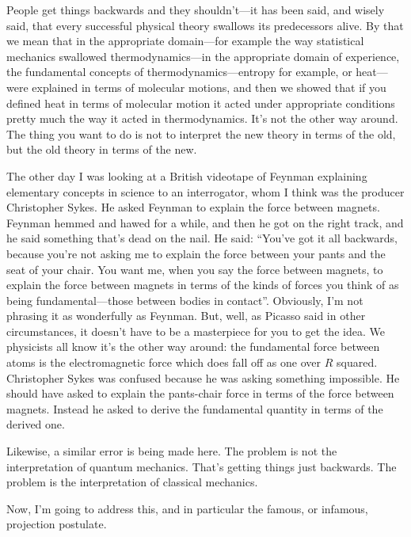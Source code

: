 \documentclass[12pt,nofootinbib]{revtex4}
\begin{document}
People get things backwards and they shouldn't---it has been said, and wisely said, that every successful physical theory swallows its predecessors alive. By that we mean that in the appropriate domain---for example the way statistical mechanics swallowed thermodynamics---in the appropriate domain of experience, the fundamental concepts of thermodynamics---entropy for example, or heat---were explained in terms of molecular motions, and then we showed that if you defined heat in terms of molecular motion it acted under appropriate conditions pretty much the way it acted in thermodynamics. It's not the other way around. The thing you want to do is not to interpret the new theory in terms of the old, but the old theory in terms of the new.

The other day I was looking at a British videotape of Feynman explaining elementary concepts in science to an interrogator, whom I think was the producer %
Christopher Sykes.  He asked Feynman to explain the force between magnets.
Feynman hemmed and hawed for a while, and then he got on the right track, and he said something that's dead on the nail. He said: ``You've got it all backwards, because you're not asking me to explain the force between %
your pants and the seat of your chair.  You want me, when you say the force between magnets, to explain the force between magnets in terms of the kinds of forces you think of as being fundamental---those between bodies in contact''. Obviously, I'm not phrasing it as wonderfully as Feynman. But, well, as Picasso said in other circumstances, it doesn't have to be a masterpiece for you to get the idea. We physicists all know it's the other way around: the fundamental force between atoms is the electromagnetic force which does fall off as one over $R$ squared. Christopher Sykes was confused because he was asking something impossible.  He should have asked to explain the pants-chair force in terms of the force between magnets.
%
Instead he asked to
derive the fundamental quantity in terms of the derived one.

Likewise, a similar error is being made here. The problem is not the interpretation of quantum mechanics. That's getting things just backwards. The problem is the interpretation of classical mechanics.

Now, I'm going to address this, and in particular the famous, or infamous, projection postulate.
\end{document}
